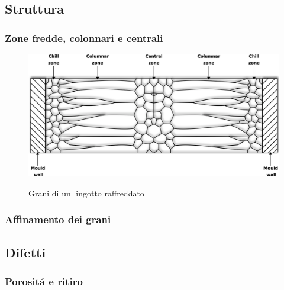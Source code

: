 \documentclass{article}
\begin{document}
        


        \clearpage
        \subsection{Struttura\label{Casting_strutt}}

            \subsubsection{Zone fredde, colonnari e centrali\label{Casting_strutt_zone}}

            \begin{figure}[h!]
                \centering
                 \label{grain_casting}
                \includegraphics[width=\textwidth]{Sources/grain.eps}
                \caption{Grani di un lingotto raffreddato \autocite{Inkscape}}
            \end{figure}

            \clearpage 

            \subsubsection{Affinamento dei grani\label{Casting_strutt_affinamento}}


            \clearpage


        \subsection{Difetti\label{Casting_difetti}}


        \clearpage 

            \subsubsection{Porositá e ritiro\label{Casting_difetti_porosita}}
\end{document}
